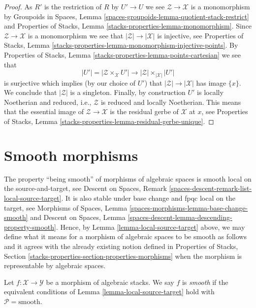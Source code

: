 \begin{proof}
As $R'$ is the restriction of $R$ by $U' \to U$ we see
$\mathcal{Z} \to \mathcal{X}$ is a monomorphism by
Groupoids in Spaces, Lemma
\ref{spaces-groupoids-lemma-quotient-stack-restrict}
and
Properties of Stacks, Lemma \ref{stacks-properties-lemma-monomorphism}.
Since $\mathcal{Z} \to \mathcal{X}$ is a monomorphism we see that
$|\mathcal{Z}| \to |\mathcal{X}|$ is injective, see
Properties of Stacks, Lemma
\ref{stacks-properties-lemma-monomorphism-injective-points}.
By
Properties of Stacks, Lemma \ref{stacks-properties-lemma-points-cartesian}
we see that
$$
|U'| = |\mathcal{Z} \times_\mathcal{X} U'|
\longrightarrow
|\mathcal{Z}| \times_{|\mathcal{X}|} |U'|
$$
is surjective which implies (by our choice of $U'$) that
$|\mathcal{Z}| \to |\mathcal{X}|$ has image $\{x\}$.
We conclude that $|\mathcal{Z}|$ is a singleton.
Finally, by construction $U'$ is locally Noetherian and reduced, i.e.,
$\mathcal{Z}$ is reduced and locally Noetherian. This means that
the essential image of $\mathcal{Z} \to \mathcal{X}$
is the residual gerbe of $\mathcal{X}$ at $x$, see
Properties of Stacks, Lemma
\ref{stacks-properties-lemma-residual-gerbe-unique}.
\end{proof}







\section{Smooth morphisms}
\label{section-smooth}

\noindent
The property ``being smooth'' of morphisms of algebraic
spaces is smooth local on the source-and-target, see
Descent on Spaces, Remark \ref{spaces-descent-remark-list-local-source-target}.
It is also stable under base change and fpqc local on the target, see
Morphisms of Spaces,
Lemma \ref{spaces-morphisms-lemma-base-change-smooth}
and
Descent on Spaces, Lemma
\ref{spaces-descent-lemma-descending-property-smooth}.
Hence, by
Lemma \ref{lemma-local-source-target}
above, we may define what it means for a morphism of algebraic spaces
to be smooth as follows and it agrees with the already
existing notion defined in
Properties of Stacks,
Section \ref{stacks-properties-section-properties-morphisms}
when the morphism is representable by algebraic spaces.

\begin{definition}
\label{definition-smooth}
Let $f : \mathcal{X} \to \mathcal{Y}$ be a morphism of algebraic stacks.
We say $f$ is {\it smooth} if the equivalent conditions of
Lemma \ref{lemma-local-source-target}
hold with $\mathcal{P} = \text{smooth}$.
\end{definition}

